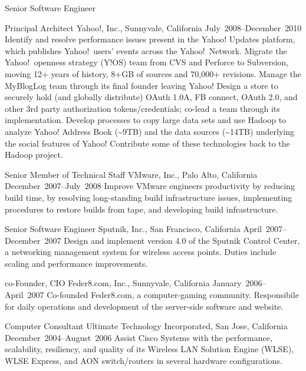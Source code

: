 \documentclass{resume}
\begin{document}
\begin{resume}
\begin{Employment}
\begin{job}{Senior Software Engineer}
\end{job}
\begin{job}{Principal Architect}
           {Yahoo!, Inc., Sunnyvale, California}
           {July~2008--December~2010}
Identify and resolve performance issues present in the Yahoo! Updates
platform, which publishes Yahoo!\ users' events across the
Yahoo!\ Network. Migrate the Yahoo!\ openness strategy (Y!OS) team
from CVS and Perforce to Subversion, moving 12+ years of history, 8+GB
of sources and 70,000+ revisions. Manage the MyBlogLog team through
its final founder leaving Yahoo! Design a store to securely hold (and
globally distribute) OAuth 1.0A, FB connect, OAuth 2.0, and other 3rd
party authorization tokens/credentials; co-lead a team through its
implementation. Develop processes to copy large data sets and use
Hadoop to analyze Yahoo! Address Book (\textasciitilde{}9TB) and the data
sources (\textasciitilde{}14TB) underlying the social features of Yahoo!
Contribute some of these technologies back to the Hadoop project.
\end{job}
\begin{job}{Senior Member of Technical Staff}
           {VMware, Inc., Palo Alto, California}
           {December~2007--July~2008}
Improve VMware engineers productivity by reducing build time, by
resolving long-standing build infrastructure issues, implementing
procedures to restore builds from tape, and developing build infrastructure.
\end{job}
\begin{job}{Senior Software Engineer}
           {Sputnik, Inc., San Francisco, California}
           {April~2007--December~2007}
Design and implement version 4.0 of the Sputnik Control Center,
a networking management system for wireless access points. Duties
include scaling and performance improvements.
\end{job}
\begin{job}{co-Founder, CIO}
           {Feder8.com, Inc., Sunnyvale, California}
           {January~2006--April~2007}
Co-founded Feder8.com, a computer-gaming community.
Responsibile for daily operations and development
of the server-side software and website.
\end{job}
\begin{job}{Computer Consultant}
           {Ultimate Technology Incorporated, San Jose, California}
           {December~2004--August~2006}
Assist Cisco Systems with the performance, scalability, resiliency,
and quality of its Wireless LAN Solution Engine (WLSE), WLSE
Express, and AON switch/routers in several hardware configurations.
\end{job}


\end{Employment}
\end{resume}
\end{document}
